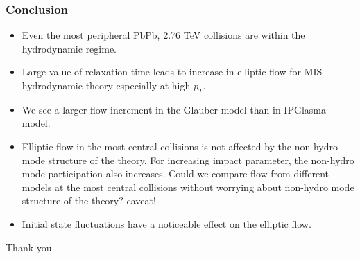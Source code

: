 \documentclass[aspectratio=1610]{beamer}
\begin{document}




\begin{frame}
\frametitle{Conclusion}

\begin{itemize}

 
\item Even the most peripheral PbPb, 2.76 TeV collisions are within the hydrodynamic regime. 

\item Large value of relaxation time leads to increase in elliptic flow for MIS hydrodynamic theory especially at high $p_T$.   

\item We see a larger flow increment in the Glauber model than in IPGlasma model. 

\item Elliptic flow in the most central collisions is not affected by the non-hydro mode structure of the
theory. For increasing impact parameter, the non-hydro mode participation also increases. 
Could we compare flow from different models at the most central collisions without worrying about non-hydro mode structure of the theory? caveat! 

\item Initial state fluctuations have a noticeable effect on the elliptic flow. 


\end{itemize}
\end{frame}



\begin{frame}
\Huge{\centerline{Thank you}}
\end{frame}

\end{document}
